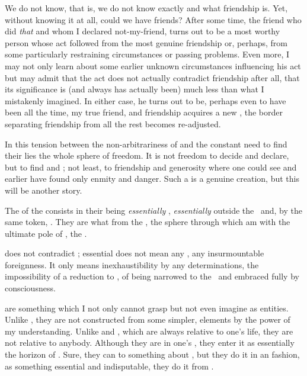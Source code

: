 We do not know, that is, we do not know exactly and  what
friendship is. Yet, without knowing it at all, could we have friends?  After some
time, the friend who did {\em that} and whom I declared not-my-friend, turns out
to be a most worthy person whose act followed from the most genuine friendship
or, perhaps, from some particularly restraining circumstances or passing
problems. Even more, I may not only learn about some earlier unknown
circumstances influencing his act but may admit that the act does not actually
contradict friendship after all, that its significance is (and always has
actually been) much less than what I mistakenly imagined. In either case, he
turns out to be, perhaps even to have been all the time, my true friend, and
friendship acquires a new , the border separating friendship from
all the rest becomes re-adjusted.

In this tension between the non-arbitrariness of  and the
constant need to find their  lies the whole sphere of
 freedom. It is not freedom to decide and declare, but to find and
; not least, to  friendship and generosity where one
could see and earlier have found only enmity and danger. Such a  is
a genuine creation, but this will be another story.


The  of the  consists in
their being {\em essentially} , {\em essentially} outside the
\hoa\ and, by the same token, .  They are what 
 from the , the sphere through which  am 
with the ultimate pole of , the .

\pa
{} does not contradict ; essential
 does not mean any , any insurmountable
foreignness. It only means inexhaustibility by any  determinations,
the impossibility of a reduction to , of being narrowed to the
\hoa\ and embraced fully by consciousness.

 are something which I not only cannot grasp but not even imagine
as entities.  Unlike , they are not constructed from some simpler,
 elements by the power of my understanding.  Unlike  and , which are always relative to one's life,
they are not relative to anybody. Although they are  in one's
, they enter it as essentially  the horizon of
. Sure, they can  to  something about , but they do it in an  fashion, as something essential and
indisputable, they do it from .

